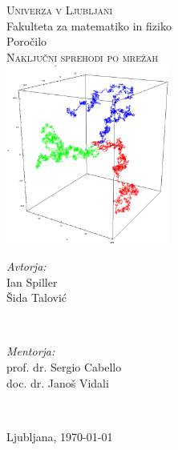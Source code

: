 \documentclass[a4paper,oneside,12pt]{article}
\begin{document}
	
\begin{titlepage}
	
	\centering
	
	\textsc{\large Univerza v Ljubljani}\\[0.3cm]
	
	{\Large Fakulteta za matematiko in fiziko}\\[3cm]
	
	{\Huge Poročilo}\\[0.3cm]
	
	\textsc{\Huge Naključni sprehodi po mrežah}\\[2cm]
	
    \includegraphics[width=0.4\textwidth]{random3D}\\[2.5cm]

	\begin{minipage}{0.45\linewidth}
		\begin{flushleft}
			\large
			\textit{Avtorja:}\\
			Ian Spiller \\
			Šida Talović 
		\end{flushleft}
    \end{minipage}
~
    \begin{minipage}{0.45\linewidth}
		\begin{flushright}
			\large
			\textit{Mentorja:}\\
			prof. dr. Sergio Cabello \\
			doc. dr. Janoš Vidali
		\end{flushright}		
	\end{minipage}\\[1.5cm]  

\vfill\vfill

{\large{Ljubljana, \today}} 

\vfill 

\end{titlepage}	
\newpage
\tableofcontents
\newpage	
\end{document}
